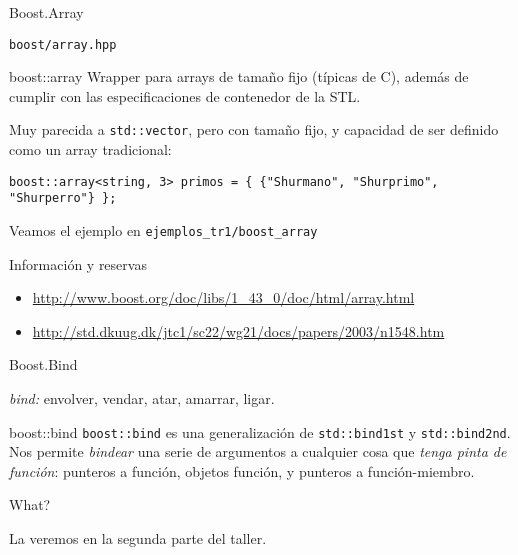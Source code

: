 \documentclass[8pt,xcolor=svgnames]{beamer}
\begin{document}
\begin{frame}[fragile]{Boost.Array}
  \begin{block}{}
    \texttt{boost/array.hpp}
  \end{block}

  \begin{block}{boost::array}
    Wrapper para arrays de tamaño fijo (típicas de C), además de
    cumplir con las especificaciones de contenedor de la STL.
    
    \medskip
    
    Muy parecida a \texttt{std::vector}, pero con tamaño fijo, y
    capacidad de ser definido como un array tradicional:
    \begin{lstlisting}[style=C++]
      boost::array<string, 3> primos = { {"Shurmano", "Shurprimo", "Shurperro"} };
    \end{lstlisting}
  \end{block}
  \pause
  \begin{block}{}
    Veamos el ejemplo en \texttt{ejemplos\_tr1/boost\_array}
  \end{block}
  \pause
  \begin{block}{Información y reservas}
    \begin{itemize}
    \item \url{http://www.boost.org/doc/libs/1_43_0/doc/html/array.html}
    \item \url{http://std.dkuug.dk/jtc1/sc22/wg21/docs/papers/2003/n1548.htm}
    \end{itemize}
    
  \end{block}
\end{frame}


\begin{frame}[fragile]{Boost.Bind}
  \begin{block}{}
    \textit{bind: } envolver, vendar, atar, amarrar, ligar.
  \end{block}
  \begin{block}{boost::bind}
    \texttt{boost::bind} es una generalización de \texttt{std::bind1st} y
    \texttt{std::bind2nd}. Nos permite \textit{bindear} una serie de
    argumentos a cualquier cosa que \textit{tenga pinta de función}:
    punteros a función, objetos función, y punteros a función-miembro.
  \end{block}

  \pause
  \begin{center}
    {\huge What?}
  \end{center}

  \pause

  \begin{block}{}
    La veremos en la segunda parte del taller.
  \end{block}
\end{frame}
\end{document}
